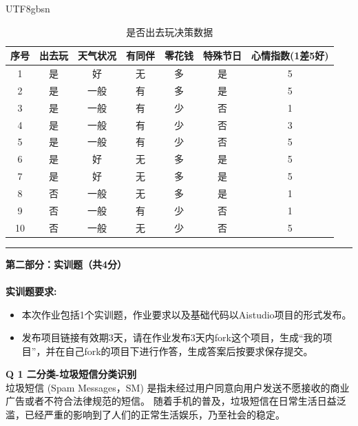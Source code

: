 \documentclass[a4paper, 11pt]{article}
\newenvironment{problem}[2][Q]
    { \begin{mdframed}[backgroundcolor=gray!20] \textbf{#1 #2} \\}
    {  \end{mdframed}}
\begin{document}
\begin{CJK}{UTF8}{gbsn}
\begin{table}[h]
    \centering
    \caption{是否出去玩决策数据}
    \label{tab:number}
    \begin{tabular}{ccccccc}
        \hline
        序号 & 出去玩 & 天气状况 & 有同伴 & 零花钱 & 特殊节日 & 心情指数(1差5好) \\
        \hline \hline
        1 & 是 & 好 & 无 & 多 & 是 & 5 \\ \hline
        2 & 是 & 一般 & 有 & 多 & 是 & 5 \\ \hline
        3 & 是 & 一般 & 有 & 少 & 否 & 1 \\ \hline
        4 & 是 & 一般 & 有 & 少 & 否 & 3 \\ \hline
        5 & 是 & 一般 & 有 & 少 & 否 & 5 \\ \hline
        6 & 是 & 好 & 无 & 多 & 是 & 5 \\ \hline
        7 & 是 & 好 & 无 & 多 & 是 & 5 \\ \hline
        8 & 否 & 一般 & 无 & 多 & 是 & 1 \\ \hline
        9 & 否 & 一般 & 有 & 少 & 否 & 1 \\ \hline
        10 & 否 & 一般 & 无 & 少 & 否 & 5 \\ \hline
    \end{tabular}
\end{table}

\newpage
\noindent\rule{7in}{1pt}
\textbf{第二部分：实训题（共4分）}
\\ \\
\textbf{实训题要求:}
\begin{itemize}
    \item 本次作业包括1个实训题，作业要求以及基础代码以Aistudio项目的形式发布。
    \item 发布项目链接有效期3天，请在作业发布3天内fork这个项目，生成``我的项目''，并在自己fork的项目下进行作答，生成答案后按要求保存提交。
\end{itemize}


\begin{problem}{1 二分类-垃圾短信分类识别}

    垃圾短信 (Spam Messages，SM) 是指未经过用户同意向用户发送不愿接收的商业广告或者不符合法律规范的短信。
随着手机的普及，垃圾短信在日常生活日益泛滥，已经严重的影响到了人们的正常生活娱乐，乃至社会的稳定。


\end{problem}
\end{CJK}
\end{document}

